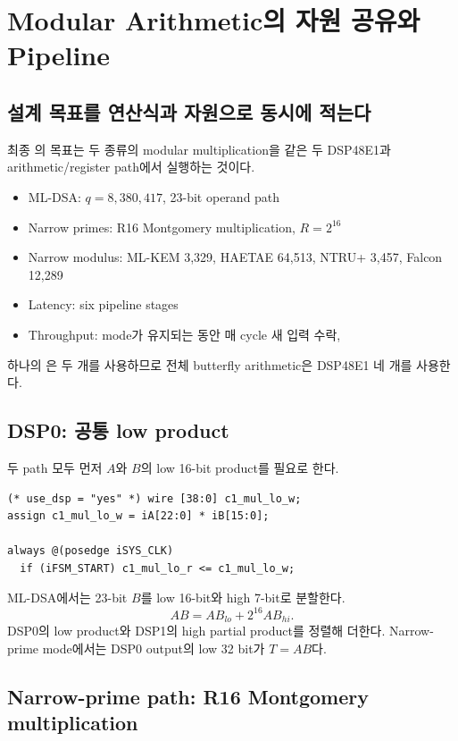 \chapter{Modular Arithmetic의 자원 공유와 Pipeline}

\section{설계 목표를 연산식과 자원으로 동시에 적는다}

최종 의 목표는 두 종류의 modular multiplication을 같은
두 DSP48E1과 arithmetic/register path에서 실행하는 것이다.

\begin{itemize}
  \item ML-DSA: $q=8{,}380{,}417$, 23-bit operand path
  \item Narrow primes: R16 Montgomery multiplication, $R=2^{16}$
  \item Narrow modulus: ML-KEM 3,329, HAETAE 64,513, NTRU+ 3,457,
        Falcon 12,289
  \item Latency: six pipeline stages
  \item Throughput: mode가 유지되는 동안 매 cycle 새 입력 수락, 
\end{itemize}

하나의 은  두 개를 사용하므로 전체
butterfly arithmetic은 DSP48E1 네 개를 사용한다.

\section{DSP0: 공통 low product}

두 path 모두 먼저 $A$와 $B$의 low 16-bit product를 필요로 한다.

\begin{lstlisting}
(* use_dsp = "yes" *) wire [38:0] c1_mul_lo_w;
assign c1_mul_lo_w = iA[22:0] * iB[15:0];

always @(posedge iSYS_CLK)
  if (iFSM_START) c1_mul_lo_r <= c1_mul_lo_w;
\end{lstlisting}

ML-DSA에서는 23-bit $B$를 low 16-bit와 high 7-bit로 분할한다.
\[
A B=A B_{lo}+2^{16}A B_{hi}.
\]
DSP0의 low product와 DSP1의 high partial product를 정렬해 더한다. Narrow-prime
mode에서는 DSP0 output의 low 32 bit가 $T=A B$다.

\section{Narrow-prime path: R16 Montgomery multiplication}

